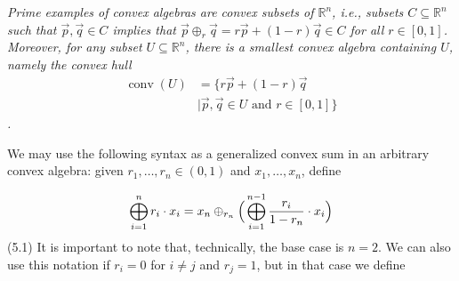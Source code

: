 \hypertarget{html:S5.Thmtheorem1.p1}{} \emph{Prime examples of convex algebras are \emph{convex} subsets of %
\hypertarget{html:S5.Thmtheorem1.p1.m1}{}\({\mathbb{R}^{n}}\), i.e., subsets %
\hypertarget{html:S5.Thmtheorem1.p1.m2}{}\({C\subseteq\mathbb{R}^{n}}\) such that %
\hypertarget{html:S5.Thmtheorem1.p1.m3}{}\({\vec{p},\vec{q}\in C}\) implies that %
\hypertarget{html:S5.Thmtheorem1.p1.m4}{}\({\vec{p}\oplus_{r}\vec{q}=r\vec{p}+(1-r)\vec{q}\in C}\) for all %
\hypertarget{html:S5.Thmtheorem1.p1.m5}{}\({r\in[0,1]}\). Moreover, for any subset %
\hypertarget{html:S5.Thmtheorem1.p1.m6}{}\({U\subseteq\mathbb{R}^{n}}\), there is a smallest convex algebra containing %
\hypertarget{html:S5.Thmtheorem1.p1.m7}{}\({U}\), namely the \emph{convex hull} %
\hypertarget{html:S5.Thmtheorem1.p1.m8}{}\[\begin{aligned}\operatorname{conv}(U)&=\{r\vec{p}+(1-r)\vec{q}\\&\mid\vec{p},\vec{q}\in U\text{ and }r\in[0,1]\}\end{aligned}\].}
\par\medskip
\hypertarget{html:S5.SS0.SSS0.P0.SPx1.p2}{} We may use the following syntax as a generalized convex sum in an arbitrary convex algebra: given %
\hypertarget{html:S5.SS0.SSS0.P0.SPx1.p2.m1}{}\({r_{1},\dots,r_{n}\in(0,1)}\) and %
\hypertarget{html:S5.SS0.SSS0.P0.SPx1.p2.m2}{}\({x_{1},\dots,x_{n}}\), define
\par\medskip
\hypertarget{html:S5.E1}{}   %
\hypertarget{html:S5.E1.m1}{}\[\bigoplus_{i=1}^{n}r_{i}\cdot x_{i}=x_{n}\oplus_{r_{n}}\Big{(}\bigoplus_{i=1}^{n-1}\frac{r_{i}}{1-r_{n}}\cdot x_{i}\Big{)}\]  (5.1)   It is important to note that, technically, the base case is %
\hypertarget{html:S5.SS0.SSS0.P0.SPx1.p2.m3}{}\({n=2}\). We can also use this notation if %
\hypertarget{html:S5.SS0.SSS0.P0.SPx1.p2.m4}{}\({r_{i}=0}\) for %
\hypertarget{html:S5.SS0.SSS0.P0.SPx1.p2.m5}{}\({i\neq j}\) and %
\hypertarget{html:S5.SS0.SSS0.P0.SPx1.p2.m6}{}\({r_{j}=1}\), but in that case we define %
